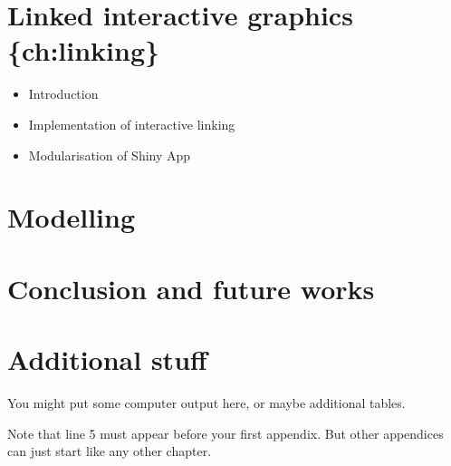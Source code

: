 \documentclass{aucklandthesis}
\begin{document}
\hypertarget{linked-interactive-graphics-chlinking}{%
\chapter{Linked interactive graphics \{ch:linking\}}\label{linked-interactive-graphics-chlinking}}

\begin{itemize}
\tightlist
\item
  Introduction
\item
  Implementation of interactive linking
\item
  Modularisation of Shiny App
\end{itemize}

\hypertarget{ch:model}{%
\chapter{Modelling}\label{ch:model}}

\hypertarget{ch:conclusion}{%
\chapter{Conclusion and future works}\label{ch:conclusion}}

\appendix

\hypertarget{additional-stuff}{%
\chapter{Additional stuff}\label{additional-stuff}}

You might put some computer output here, or maybe additional tables.

Note that line 5 must appear before your first appendix. But other appendices can just start like any other chapter.

\printbibliography[heading=bibintoc]
\end{document}

